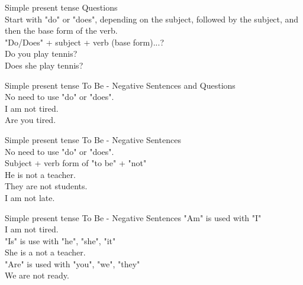 \documentclass{beamer}
\begin{document}
\begin{frame}{Simple present tense}
\centering
Questions\\
\vspace{0.3in}
Start with "do" or "does", depending on the subject, followed by the subject, and then the base form of the verb.\\
\vspace{0.2in}
"Do/Does" + subject + verb (base form)...?\\
\vspace{0.5in}
Do you play tennis?\\
Does she play tennis?\\   
\end{frame}

\begin{frame}{Simple present tense}
\centering
To Be - Negative Sentences and Questions\\
\vspace{0.3in}
No need to use "do" or "does".\\
\vspace{0.5in}
I am not tired.\\
Are you tired.
\end{frame}

\begin{frame}{Simple present tense}
\centering
To Be - Negative Sentences\\
\vspace{0.3in}
No need to use "do" or "does".\\
\vspace{0.2in}
Subject + verb form of "to be" + "not"\\
\vspace{0.3in}
He is not a teacher.\\
They are not students.\\
I am not late.
\end{frame}

\begin{frame}{Simple present tense}
\centering
To Be - Negative Sentences
\vspace{0.4in}
"Am" is used with "I"\\
I am not tired.\\
"Is" is use with "he", "she", "it"\\
She is a not a teacher.\\
"Are" is used with "you", "we", "they"\\
We are not ready.
\end{frame}
\end{document}
